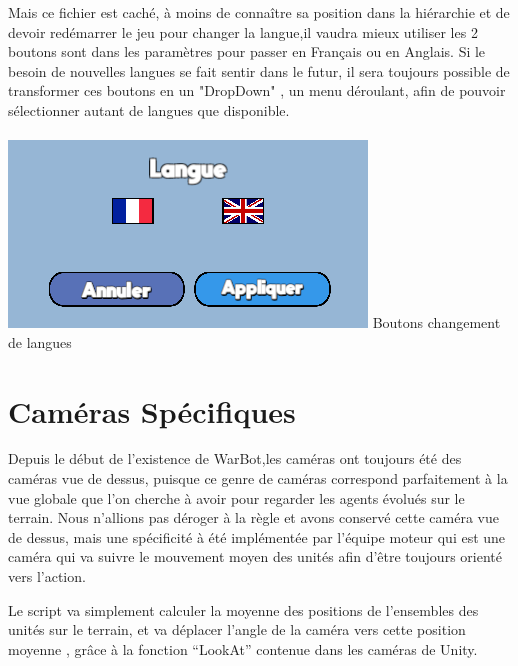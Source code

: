 \documentclass{report}
\begin{document}
Mais ce fichier est caché, à moins de connaître sa position dans la hiérarchie et de devoir redémarrer le jeu pour changer la langue,il vaudra mieux utiliser les 2 boutons sont dans les paramètres pour passer en Français ou en Anglais. Si le besoin de nouvelles langues se fait sentir dans le futur, il sera toujours possible de transformer ces boutons en un "DropDown" , un menu déroulant, afin de pouvoir sélectionner autant de langues que disponible.

\paragraph{}
\begin{center}
\includegraphics[scale=0.8]{DATA/langue.png}
 {Boutons changement de langues}
\end{center}
\paragraph{}
\newpage


\section{Caméras Spécifiques}

Depuis le début de l’existence de WarBot,les caméras ont toujours été des caméras vue de dessus, puisque ce genre de caméras correspond parfaitement à la vue globale que l’on cherche à avoir pour regarder les agents évolués sur le terrain.
Nous n’allions pas déroger à la règle et avons conservé cette caméra vue de dessus, mais une spécificité à été implémentée par l’équipe moteur qui est une caméra qui va suivre le mouvement moyen des unités afin d'être toujours orienté vers l’action. 

Le script va simplement calculer la moyenne des positions de l’ensembles des unités sur le terrain, et va déplacer l’angle de la caméra vers cette position moyenne , grâce à la fonction “LookAt” contenue dans les caméras de Unity. 
\end{document}
